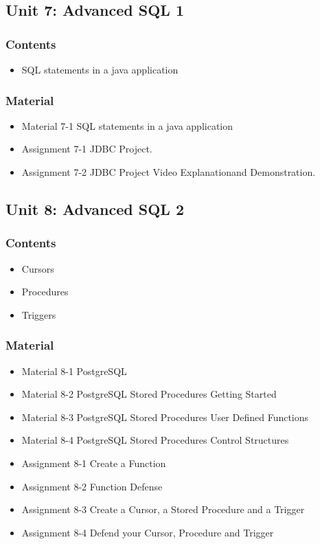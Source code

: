 \documentclass[catalan, a4paper, 12pt, titlepage]{article}
\begin{document}
  \subsection{Unit 7: Advanced SQL 1}
  
  \subsubsection{Contents}
  \begin{itemize}
	  \item SQL statements in a java application
  \end{itemize}

  \subsubsection{Material}
  \begin{itemize}
	  \item Material 7-1 SQL statements in a java application
	  \item Assignment 7-1 JDBC Project.
	  \item Assignment 7-2 JDBC Project Video Explanationand Demonstration.
  \end{itemize}

  \subsection{Unit 8: Advanced SQL 2}

  \subsubsection{Contents}
  \begin{itemize}
	  \item Cursors
	  \item Procedures
	  \item Triggers
  \end{itemize}

  \subsubsection{Material}
  \begin{itemize}
	  \item Material 8-1 PostgreSQL
	  \item Material 8-2 PostgreSQL Stored Procedures Getting Started
	  \item Material 8-3 PostgreSQL Stored Procedures User Defined Functions
	  \item Material 8-4 PostgreSQL Stored Procedures Control Structures
	  \item Assignment 8-1 Create a Function
	  \item Assignment 8-2 Function Defense
	  \item Assignment 8-3 Create a Cursor, a Stored Procedure and a Trigger
	  \item Assignment 8-4 Defend your Cursor, Procedure and Trigger
  \end{itemize}
\end{document}
